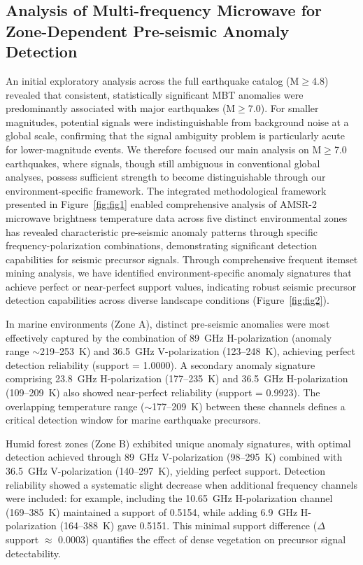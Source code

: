 \documentclass[preprint,review,12pt,authoryear]{elsarticle}
\begin{document}
\subsection{Analysis of Multi-frequency Microwave for Zone-Dependent Pre-seismic Anomaly Detection}
An initial exploratory analysis across the full earthquake catalog (M$\ge$4.8) revealed that consistent, statistically significant MBT anomalies were predominantly associated with major earthquakes (M$\ge$7.0). For smaller magnitudes, potential signals were indistinguishable from background noise at a global scale, confirming that the signal ambiguity problem is particularly acute for lower-magnitude events. We therefore focused our main analysis on M$\ge$7.0 earthquakes, where signals, though still ambiguous in conventional global analyses, possess sufficient strength to become distinguishable through our environment-specific framework. The integrated methodological framework presented in Figure~\ref{fig:fig1} enabled comprehensive analysis of AMSR-2 microwave brightness temperature data across five distinct environmental zones has revealed characteristic pre-seismic anomaly patterns through specific frequency-polarization combinations, demonstrating significant detection capabilities for seismic precursor signals. Through comprehensive frequent itemset mining analysis, we have identified environment-specific anomaly signatures that achieve perfect or near-perfect support values, indicating robust seismic precursor detection capabilities across diverse landscape conditions (Figure~\ref{fig:fig2}).

In marine environments (Zone A), distinct pre-seismic anomalies were most effectively captured by the combination of 89~GHz H-polarization (anomaly range $\sim$219--253~K) and 36.5~GHz V-polarization (123--248~K), achieving perfect detection reliability (support = 1.0000). A secondary anomaly signature comprising 23.8~GHz H-polarization (177--235~K) and 36.5~GHz H-polarization (109--209~K) also showed near-perfect reliability (support = 0.9923). The overlapping temperature range ($\sim$177--209~K) between these channels defines a critical detection window for marine earthquake precursors.

Humid forest zones (Zone B) exhibited unique anomaly signatures, with optimal detection achieved through 89~GHz V-polarization (98--295~K) combined with 36.5~GHz V-polarization (140--297~K), yielding perfect support. Detection reliability showed a systematic slight decrease when additional frequency channels were included: for example, including the 10.65~GHz H-polarization channel (169--385~K) maintained a support of 0.5154, while adding 6.9~GHz H-polarization (164--388~K) gave 0.5151. This minimal support difference ($\Delta$support $\approx$ 0.0003) quantifies the effect of dense vegetation on precursor signal detectability.
\end{document}
